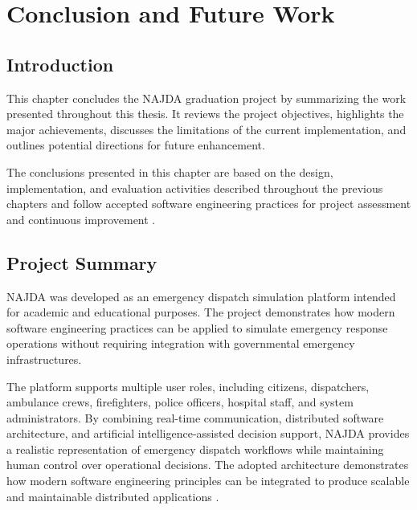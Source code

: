 \chapter{Conclusion and Future Work}
\label{chap:conclusion}

\section{Introduction}

This chapter concludes the NAJDA graduation project by summarizing the work presented throughout this thesis. It reviews the project objectives, highlights the major achievements, discusses the limitations of the current implementation, and outlines potential directions for future enhancement.

The conclusions presented in this chapter are based on the design, implementation, and evaluation activities described throughout the previous chapters and follow accepted software engineering practices for project assessment and continuous improvement \cite{pressman2020se,sommerville2016software}.


\section{Project Summary}

NAJDA was developed as an emergency dispatch simulation platform intended for academic and educational purposes. The project demonstrates how modern software engineering practices can be applied to simulate emergency response operations without requiring integration with governmental emergency infrastructures.

The platform supports multiple user roles, including citizens, dispatchers, ambulance crews, firefighters, police officers, hospital staff, and system administrators. By combining real-time communication, distributed software architecture, and artificial intelligence-assisted decision support, NAJDA provides a realistic representation of emergency dispatch workflows while maintaining human control over operational decisions. The adopted architecture demonstrates how modern software engineering principles can be integrated to produce scalable and maintainable distributed applications \cite{bass2022software,newman2021microservices}.


